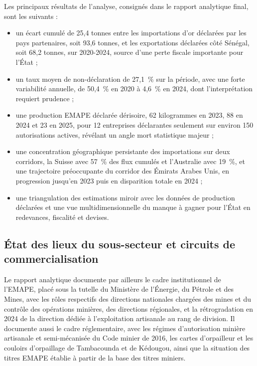 \documentclass[12pt, a4paper]{article}
\begin{document}
Les principaux résultats de l'analyse, consignés dans le rapport analytique
final, sont les suivants :

\begin{itemize}
  \item un écart cumulé de 25,4 tonnes entre les importations d'or déclarées
  par les pays partenaires, soit 93,6 tonnes, et les exportations déclarées
  côté Sénégal, soit 68,2 tonnes, sur 2020-2024, source d'une perte fiscale
  importante pour l'État ;
  \item un taux moyen de non-déclaration de 27,1~\% sur la période,
  avec une forte variabilité annuelle, de 50,4~\% en 2020 à 4,6~\% en 2024, dont
  l'interprétation requiert prudence ;
  \item une production EMAPE déclarée dérisoire, 62 kilogrammes en 2023, 88 en
  2024 et 23 en 2025, pour 12 entreprises déclarantes seulement
  sur environ 150 autorisations actives, révélant un angle mort statistique
  majeur ;
  \item une concentration géographique persistante des importations
  sur deux corridors, la Suisse avec 57~\% des flux cumulés et l'Australie avec
  19~\%, et une trajectoire préoccupante du corridor des Émirats Arabes Unis,
  en progression jusqu'en 2023 puis en disparition totale en 2024 ;
  \item une triangulation des estimations miroir avec les données de
  production déclarées et une vue multidimensionnelle du manque à gagner pour
  l'État en redevances, fiscalité et devises.
\end{itemize}

\subsection{État des lieux du sous-secteur et circuits de commercialisation}

Le rapport analytique documente par ailleurs le cadre institutionnel de
l'EMAPE, placé sous la tutelle du Ministère de l'Énergie, du Pétrole et des
Mines, avec les rôles respectifs des directions nationales chargées des mines
et du contrôle des opérations minières, des directions régionales, et la
rétrogradation en 2024 de la direction dédiée à l'exploitation artisanale au
rang de division. Il documente aussi le cadre réglementaire, avec les régimes
d'autorisation minière artisanale et semi-mécanisée du Code minier de 2016,
les cartes d'orpailleur et les couloirs d'orpaillage de Tambacounda et de
Kédougou, ainsi que la situation des titres EMAPE établie à partir de la base
des titres miniers.
\end{document}
